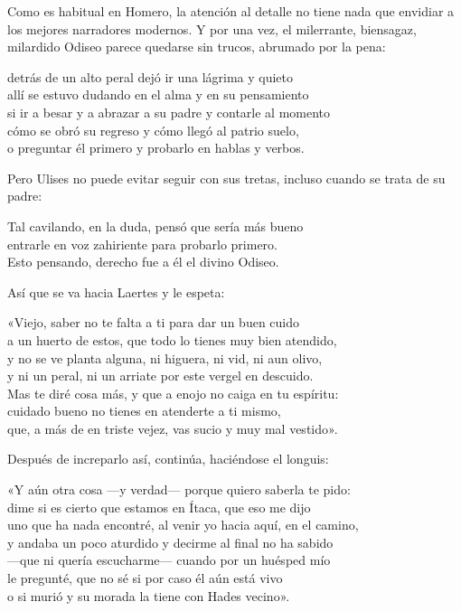 Como es habitual en Homero, la atención al detalle no tiene nada que envidiar a los mejores narradores modernos. Y por una vez, el milerrante, biensagaz, milardido Odiseo parece quedarse sin trucos, abrumado por la pena:

\begin{versocita}
[...] detrás de un alto peral dejó ir una lágrima y quieto\\
allí se estuvo dudando en el alma y en su pensamiento\\
si ir a besar y a abrazar a su padre y contarle al momento\\
cómo se obró su regreso y cómo llegó al patrio suelo,\\
o preguntar él primero y probarlo en hablas y verbos.
\end{versocita}

Pero Ulises no puede evitar seguir con sus tretas, incluso cuando se trata de su padre:

\begin{versocita}
Tal cavilando, en la duda, pensó que sería más bueno\\
entrarle en voz zahiriente para probarlo primero.\\
Esto pensando, derecho fue a él el divino Odiseo.
\end{versocita}

Así que se va hacia Laertes y le espeta:

\begin{versocita}
«Viejo, saber no te falta a ti para dar un buen cuido\\
a un huerto de estos, que todo lo tienes muy bien atendido,\\
y no se ve planta alguna, ni higuera, ni vid, ni aun olivo,\\
y ni un peral, ni un arriate por este vergel en descuido.\\
Mas te diré cosa más, y que a enojo no caiga en tu espíritu:\\
cuidado bueno no tienes en atenderte a ti mismo,\\
que, a más de en triste vejez, vas sucio y muy mal vestido».
\end{versocita}

Después de increparlo así, continúa, haciéndose el longuis:

\begin{versocita}
«Y aún otra cosa ---y verdad--- porque quiero saberla te pido:\\
dime si es cierto que estamos en Ítaca, que eso me dijo\\
uno que ha nada encontré, al venir yo hacia aquí, en el camino,\\
y andaba un poco aturdido y decirme al final no ha sabido\\
---que ni quería escucharme--- cuando por un huésped mío\\
le pregunté, que no sé si por caso él aún está vivo\\
o si murió y su morada la tiene con Hades vecino».
\end{versocita}

